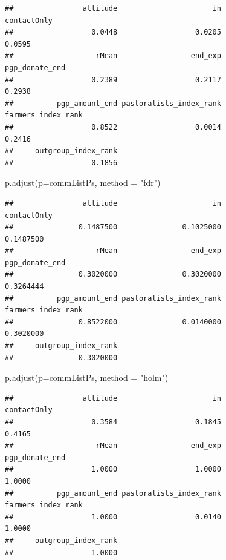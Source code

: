 \documentclass[
]{article}
\newenvironment{Shaded}{\begin{snugshade}}{\end{snugshade}}
\newcommand{\AttributeTok}[1]{\textcolor[rgb]{0.77,0.63,0.00}{#1}}
\newcommand{\FunctionTok}[1]{\textcolor[rgb]{0.00,0.00,0.00}{#1}}
\newcommand{\NormalTok}[1]{#1}
\newcommand{\StringTok}[1]{\textcolor[rgb]{0.31,0.60,0.02}{#1}}
\begin{document}
\begin{verbatim}
##                attitude                      in             contactOnly 
##                  0.0448                  0.0205                  0.0595 
##                   rMean                 end_exp          pgp_donate_end 
##                  0.2389                  0.2117                  0.2938 
##          pgp_amount_end pastoralists_index_rank      farmers_index_rank 
##                  0.8522                  0.0014                  0.2416 
##     outgroup_index_rank 
##                  0.1856
\end{verbatim}

\begin{Shaded}
\begin{Highlighting}[]
\FunctionTok{p.adjust}\NormalTok{(}\AttributeTok{p=}\NormalTok{commListPs, }\AttributeTok{method =} \StringTok{"fdr"}\NormalTok{)}
\end{Highlighting}
\end{Shaded}

\begin{verbatim}
##                attitude                      in             contactOnly 
##               0.1487500               0.1025000               0.1487500 
##                   rMean                 end_exp          pgp_donate_end 
##               0.3020000               0.3020000               0.3264444 
##          pgp_amount_end pastoralists_index_rank      farmers_index_rank 
##               0.8522000               0.0140000               0.3020000 
##     outgroup_index_rank 
##               0.3020000
\end{verbatim}

\begin{Shaded}
\begin{Highlighting}[]
\FunctionTok{p.adjust}\NormalTok{(}\AttributeTok{p=}\NormalTok{commListPs, }\AttributeTok{method =} \StringTok{"holm"}\NormalTok{)}
\end{Highlighting}
\end{Shaded}

\begin{verbatim}
##                attitude                      in             contactOnly 
##                  0.3584                  0.1845                  0.4165 
##                   rMean                 end_exp          pgp_donate_end 
##                  1.0000                  1.0000                  1.0000 
##          pgp_amount_end pastoralists_index_rank      farmers_index_rank 
##                  1.0000                  0.0140                  1.0000 
##     outgroup_index_rank 
##                  1.0000
\end{verbatim}
\end{document}
